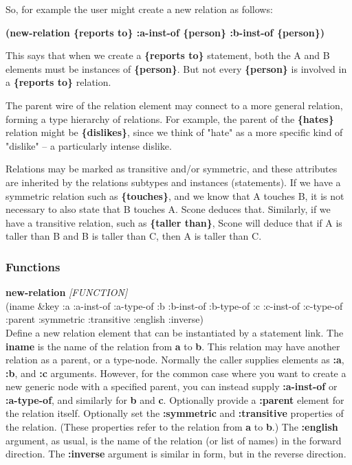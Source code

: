 \documentclass[titlepage,twoside,openright,11pt]{article}
\begin{document}
So, for example the user might create a new relation as follows:

\textbf{(new-relation \{reports to\} :a-inst-of \{person\} :b-inst-of
\{person\})}

This says that when we create a \textbf{\{reports to\}} statement, both
the A and B elements must be instances of \textbf{\{person\}}. But not
every \textbf{\{person\}} is involved in a \textbf{\{reports to\}}
relation.

The parent wire of the relation element may connect to a more general
relation, forming a type hierarchy of relations. For example, the parent
of the \textbf{\{hates\}} relation might be \textbf{\{dislikes\}}, since
we think of "hate" as a more specific kind of "dislike" -- a
particularly intense dislike.

Relations may be marked as transitive and/or symmetric, and these
attributes are inherited by the relation\textquotesingle s subtypes and
instances (statements). If we have a symmetric relation such as
\textbf{\{touches\}}, and we know that A touches B, it is not necessary
to also state that B touches A. Scone deduces that. Similarly, if we
have a transitive relation, such as \textbf{\{taller than\}}, Scone will
deduce that if A is taller than B and B is taller than C, then A is
taller than C.

\subsubsection{Functions}\label{functions-8}

\textbf{new-relation} \emph{{[}FUNCTION{]}\\
} (iname \&key :a :a-inst-of :a-type-of :b :b-inst-of :b-type-of :c
:c-inst-of :c-type-of\\
:parent :symmetric :transitive :english :inverse)\\
Define a new relation element that can be instantiated by a statement
link. The \textbf{iname} is the name of the relation from \textbf{a} to
\textbf{b}. This relation may have another relation as a parent, or a
type-node. Normally the caller supplies elements as \textbf{:a},
\textbf{:b}, and \textbf{:c} arguments. However, for the common case
where you want to create a new generic node with a specified parent, you
can instead supply \textbf{:a-inst-of} or \textbf{:a-type-of}, and
similarly for \textbf{b} and \textbf{c}. Optionally provide a
\textbf{:parent} element for the relation itself. Optionally set the
\textbf{:symmetric} and \textbf{:transitive} properties of the relation.
(These properties refer to the relation from \textbf{a} to \textbf{b}.)
The \textbf{:english} argument, as usual, is the name of the relation
(or list of names) in the forward direction. The \textbf{:inverse}
argument is similar in form, but in the reverse direction.
\end{document}
